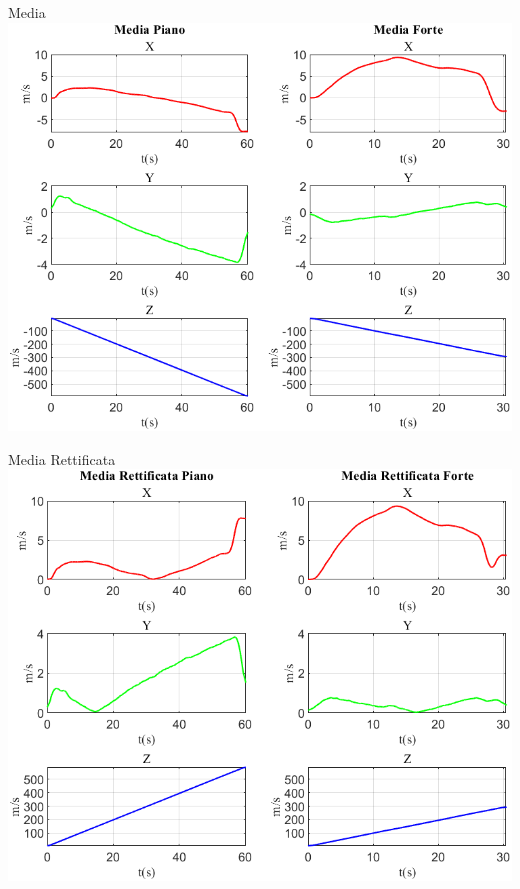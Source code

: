 	\begin{frame}{{Media}}
		\centering\includegraphics[height=.8\textheight]{figure/Vel/Media}
	\end{frame}
	
	\begin{frame}{{Media Rettificata}}
		\centering\includegraphics[height=.8\textheight]{figure/Vel/Media Rettificata}
	\end{frame}
	
